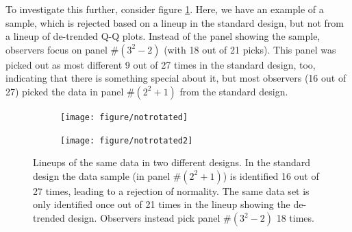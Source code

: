 \documentclass{article}\usepackage[]{graphicx}\usepackage[]{color}
\newenvironment{knitrout}{}{} %
\newcommand{\hh}[1]{{\color{magenta} #1}}
\begin{document}
\hh{To investigate this further, consider figure \ref{fig:rotstd}. Here, we have an example of a sample, which is rejected based on a  lineup in the standard design, but not from a lineup of de-trended Q-Q plots. Instead of the panel showing the sample, observers focus on panel \#$(3^2-2)$ (with 18 out of 21 picks). This panel was picked out as most different 9 out of 27 times in the standard design, too, indicating that there is something special about it, but most observers (16 out of 27) picked the data in panel \#$(2^2+1)$ from the standard design. }
\begin{figure}[hbt]
\begin{subfigure}{0.5\textwidth}
\begin{knitrout}
\color{fgcolor}
\texttt{[image: figure/notrotated]} 

\end{knitrout}

\end{subfigure}
\begin{subfigure}{0.5\textwidth}
\begin{knitrout}
\color{fgcolor}
\texttt{[image: figure/notrotated2]} 

\end{knitrout}

\end{subfigure}
\caption{\label{fig:rotstd}Lineups of the same data in two different designs. In the standard design the data sample (in panel \#$(2^2+1)$) is identified 16 out of 27 times, leading to a rejection of normality. The same data set is only identified once out of 21 times in the lineup showing the de-trended design. Observers instead pick panel \#$(3^2-2)$ 18 times. }
\end{figure}
\end{document}
